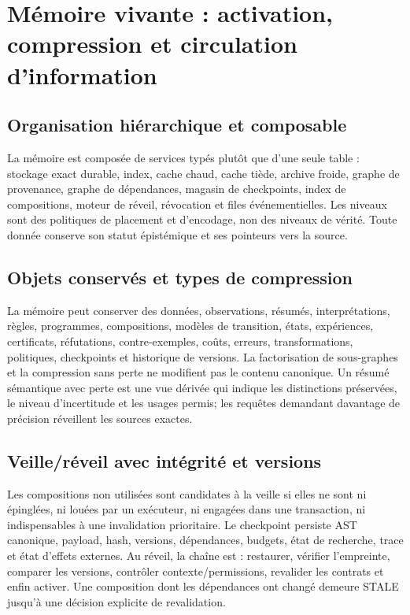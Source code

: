 \documentclass[11pt,a4paper]{article}
\newcommand{\State}[1]{\textsf{#1}}
\begin{document}
\section{Mémoire vivante : activation, compression et circulation d'information}
\subsection{Organisation hiérarchique et composable}
La mémoire est composée de services typés plutôt que d'une seule table : stockage exact durable, index, cache chaud, cache tiède, archive froide, graphe de provenance, graphe de dépendances, magasin de checkpoints, index de compositions, moteur de réveil, révocation et files événementielles. Les niveaux sont des politiques de placement et d'encodage, non des niveaux de vérité. Toute donnée conserve son statut épistémique et ses pointeurs vers la source.

\subsection{Objets conservés et types de compression}
La mémoire peut conserver des données, observations, résumés, interprétations, règles, programmes, compositions, modèles de transition, états, expériences, certificats, réfutations, contre-exemples, coûts, erreurs, transformations, politiques, checkpoints et historique de versions. La factorisation de sous-graphes et la compression sans perte ne modifient pas le contenu canonique. Un résumé sémantique avec perte est une vue dérivée qui indique les distinctions préservées, le niveau d'incertitude et les usages permis; les requêtes demandant davantage de précision réveillent les sources exactes.

\subsection{Veille/réveil avec intégrité et versions}
Les compositions non utilisées sont candidates à la veille si elles ne sont ni épinglées, ni louées par un exécuteur, ni engagées dans une transaction, ni indispensables à une invalidation prioritaire. Le checkpoint persiste AST canonique, payload, hash, versions, dépendances, budgets, état de recherche, trace et état d'effets externes. Au réveil, la chaîne est : restaurer, vérifier l'empreinte, comparer les versions, contrôler contexte/permissions, revalider les contrats et enfin activer. Une composition dont les dépendances ont changé demeure \State{STALE} jusqu'à une décision explicite de revalidation.
\end{document}
